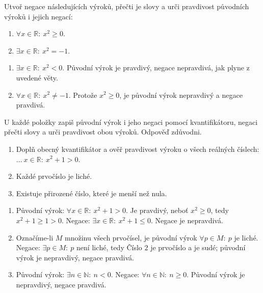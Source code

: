 \documentclass[11pt,a4paper]{article}
\begin{document}
\begin{prikladReseniBox}[title={Příklad 3}]
Utvoř negace následujících výroků, přečti je slovy a urči pravdivost
původních výroků i jejich negací:
\begin{enumerate}[label=\alph*)]
  \item $\forall x\in\mathbb{R}:\ x^2\geq0$.
  \item $\exists x\in\mathbb{R}:\ x^2=-1$.
\end{enumerate}
\tcblower
\begin{enumerate}[label=\alph*)]
  \item $\exists x\in\mathbb{R}:\ x^2<0$.
  Původní výrok je pravdivý, negace nepravdivá, jak plyne z uvedené věty.
  \item $\forall x\in\mathbb{R}:\ x^2\ne-1$.
  Protože $x^2\geq0$, je původní výrok nepravdivý a negace pravdivá.
\end{enumerate}
\end{prikladReseniBox}


\newpage
{}
\begin{zadaniReseniBox}[title={Samostatná práce 1}]
U každé položky zapiš původní výrok i jeho negaci pomocí kvantifikátoru,
negaci přečti slovy a urči pravdivost obou výroků. Odpověď zdůvodni.
\begin{enumerate}[label=\alph*)]
  \item Doplň obecný kvantifikátor a ověř pravdivost výroku o všech
  reálných číslech: $\ldots\ x\in\mathbb{R}:\ x^2+1>0$.
  \item Každé prvočíslo je liché.
  \item Existuje přirozené číslo, které je menší než nula.
\end{enumerate}
\tcblower
\begin{enumerate}[label=\alph*)]
  \item Původní výrok: $\forall x\in\mathbb{R}:\ x^2+1>0$.
  Je pravdivý, neboť $x^2\geq0$, tedy $x^2+1\geq1>0$.
  Negace: $\exists x\in\mathbb{R}:\ x^2+1\leq0$.
  Negace je nepravdivá.
  \item Označíme-li $M$ množinu všech prvočísel, je původní výrok
  $\forall p\in M:\ p\text{ je liché}$.
  Negace: $\exists p\in M:\ p\text{ není liché}$, tedy
  Číslo $2$ je prvočíslo a je sudé; původní výrok je nepravdivý,
  negace pravdivá.
  \item Původní výrok: $\exists n\in\mathbb{N}:\ n<0$.
  Negace: $\forall n\in\mathbb{N}:\ n\geq0$.
  Původní výrok je nepravdivý, negace pravdivá.
\end{enumerate}
\end{zadaniReseniBox}
\end{document}
